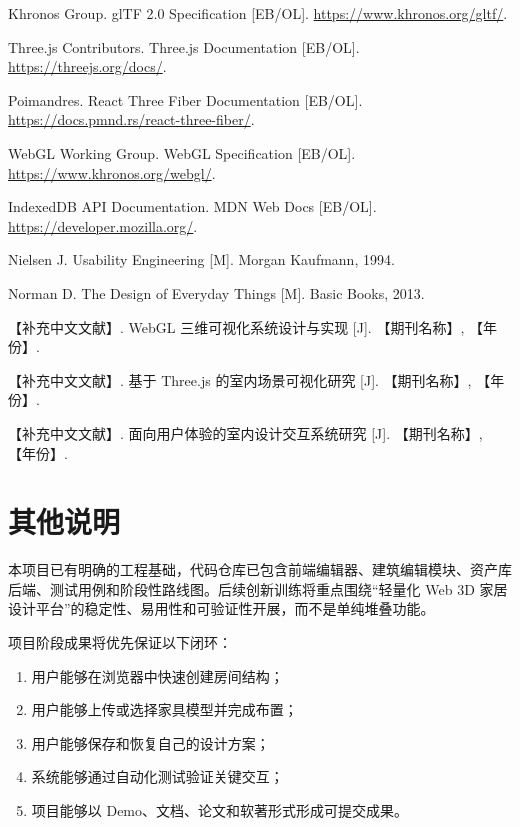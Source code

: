 \documentclass[UTF8,fontset=fandol,zihao=-4]{ctexart}
\begin{document}
\begin{enumerate}[label={[\arabic*]}]
  \item Khronos Group. glTF 2.0 Specification [EB/OL]. \url{https://www.khronos.org/gltf/}.
  \item Three.js Contributors. Three.js Documentation [EB/OL]. \url{https://threejs.org/docs/}.
  \item Poimandres. React Three Fiber Documentation [EB/OL]. \url{https://docs.pmnd.rs/react-three-fiber/}.
  \item WebGL Working Group. WebGL Specification [EB/OL]. \url{https://www.khronos.org/webgl/}.
  \item IndexedDB API Documentation. MDN Web Docs [EB/OL]. \url{https://developer.mozilla.org/}.
  \item Nielsen J. Usability Engineering [M]. Morgan Kaufmann, 1994.
  \item Norman D. The Design of Everyday Things [M]. Basic Books, 2013.
  \item 【补充中文文献】. WebGL 三维可视化系统设计与实现 [J]. 【期刊名称】, 【年份】.
  \item 【补充中文文献】. 基于 Three.js 的室内场景可视化研究 [J]. 【期刊名称】, 【年份】.
  \item 【补充中文文献】. 面向用户体验的室内设计交互系统研究 [J]. 【期刊名称】, 【年份】.
\end{enumerate}

\section{其他说明}

本项目已有明确的工程基础，代码仓库已包含前端编辑器、建筑编辑模块、资产库后端、测试用例和阶段性路线图。后续创新训练将重点围绕“轻量化 Web 3D 家居设计平台”的稳定性、易用性和可验证性开展，而不是单纯堆叠功能。

项目阶段成果将优先保证以下闭环：

\begin{enumerate}
  \item 用户能够在浏览器中快速创建房间结构；
  \item 用户能够上传或选择家具模型并完成布置；
  \item 用户能够保存和恢复自己的设计方案；
  \item 系统能够通过自动化测试验证关键交互；
  \item 项目能够以 Demo、文档、论文和软著形式形成可提交成果。
\end{enumerate}
\end{document}
